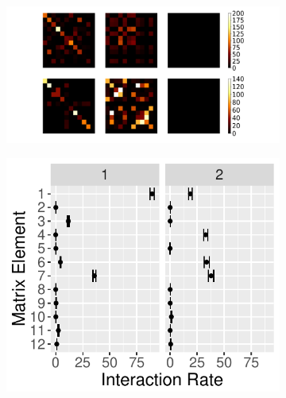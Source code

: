 \documentclass{article}
\begin{document}
\begin{figure}
    \centering
    \begin{subfigure}[b]{0.29\textwidth}
        \includegraphics[width=\textwidth]{heatmap.pdf}
        \caption{}
        \label{fig:heatmap}
    \end{subfigure}
    \qquad %
    \begin{subfigure}[b]{0.21\textwidth}
        \includegraphics[width=\textwidth]{SchoolRateMatrix.pdf}
        \caption{}
        \label{fig:SchoolRateMatrix}
    \end{subfigure}
    \qquad %
    \begin{subfigure}[b]{0.21\textwidth}

\end{subfigure}
\end{figure}
\end{document}
